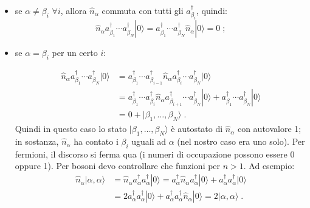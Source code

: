 \documentclass[10pt,a4paper]{report}
\theoremstyle{definition}
\numberwithin{equation}{section}
\newcommand{\ket}{\rangle}
\begin{document}
\begin{itemize}
\item se $\alpha\ne \beta_i$ $\forall i$, allora $\hat{n}_{\alpha}$ commuta con tutti gli $a_{\beta_i}^{\dagger}$, quindi:
$$
\hat{n}_{\alpha}a_{\beta_1}^{\dagger}\cdots a_{\beta_N}^{\dagger}|0\ket=a_{\beta_1}^{\dagger}\cdots a_{\beta_N}^{\dagger}\hat{n}_{\alpha}|0\ket=0\;;
$$
\item se $\alpha=\beta_i$ per un certo $i$:

\begin{align*}
\hat{n}_{\alpha}a_{\beta_1}^{\dagger}\cdots a_{\beta_N}^{\dagger}|0\ket &=
a_{\beta_1}^{\dagger}\cdots a_{\beta_{i-1}}^{\dagger}\hat{n}_{\alpha} a_{\beta_i}^{\dagger}\cdots a_{\beta_N}^{\dagger}|0\ket \\
&= a_{\beta_1}^{\dagger}\cdots a_{\beta_i}^{\dagger}\hat{n}_{\alpha} a_{\beta_{i+1}}^{\dagger}\cdots a_{\beta_N}^{\dagger}|0\ket+a_{\beta_1}^{\dagger}\cdots a_{\beta_N}^{\dagger}|0\ket \\
&= 0+|\beta_1,\ldots,\beta_N\ket\;.
\end{align*}
Quindi in questo caso lo stato $|\beta_1,\ldots,\beta_N\ket$ è autostato di $\hat{n}_{\alpha}$ con autovalore 1; in sostanza, $\hat{n}_{\alpha}$ ha contato i $\beta_i$ uguali ad $\alpha$ (nel nostro caso era uno solo). Per fermioni, il discorso si ferma qua (i numeri di occupazione possono essere 0 oppure 1). Per bosoni devo controllare che funzioni per $n>1$. Ad esempio:
\begin{align*}
\hat{n}_{\alpha}|\alpha,\alpha\ket &= \hat{n}_{\alpha}a_{\alpha}^{\dagger}a_{\alpha}^{\dagger}|0\ket = a_{\alpha}^{\dagger}\hat{n}_{\alpha}a_{\alpha}^{\dagger}|0\ket+a_{\alpha}^{\dagger}a_{\alpha}^{\dagger}|0\ket \\
&= 2a_{\alpha}^{\dagger}a_{\alpha}^{\dagger}|0\ket+a_{\alpha}^{\dagger}a_{\alpha}^{\dagger}\hat{n}_{\alpha}|0\ket= 2|\alpha,\alpha\ket\;.
\end{align*}

\end{itemize}
\end{document}
